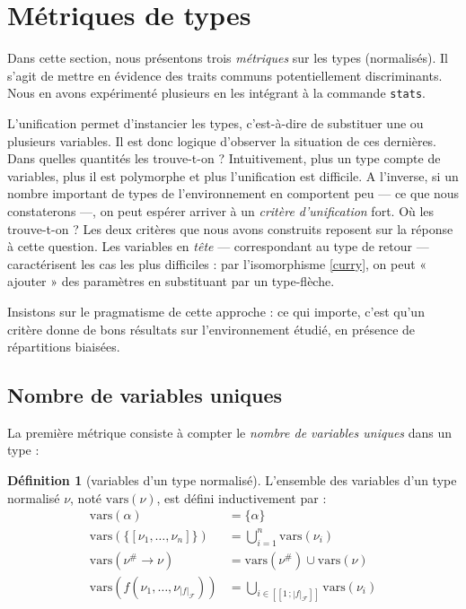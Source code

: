 \documentclass[a4paper]{report}
\theoremstyle{definition}
\newtheorem{definition}[theoreme]{Définition}
\newcommand{\interval}[2]{[\![#1\,;#2]\!]}
\newcommand{\mset}[1]{\{\![#1]\!\}}
\newcommand{\F}{\mathscr{F}}
\begin{document}

\section{Métriques de types}

Dans cette section, nous présentons trois \emph{métriques} sur les types (normalisés). Il s'agit de mettre en évidence des traits communs potentiellement discriminants. Nous en avons expérimenté plusieurs en les intégrant à la commande \texttt{stats}.

L'unification permet d'instancier les types, c'est-à-dire de substituer une ou plusieurs variables. Il est donc logique d'observer la situation de ces dernières. Dans quelles quantités les trouve-t-on ? Intuitivement, plus un type compte de variables, plus il est polymorphe et plus l'unification est difficile. A l'inverse, si un nombre important de types de l'environnement en comportent peu — ce que nous constaterons —, on peut espérer arriver à un \emph{critère d'unification} fort. Où les trouve-t-on ? Les deux critères que nous avons construits reposent sur la réponse à cette question. Les variables en \emph{tête} — correspondant au type de retour — caractérisent les cas les plus difficiles : par l'isomorphisme \eqref{curry}, on peut « ajouter » des paramètres en substituant par un type-flèche.

Insistons sur le pragmatisme de cette approche : ce qui importe, c'est qu'un critère donne de bons résultats sur l'environnement étudié, en présence de répartitions biaisées.


\subsection{Nombre de variables uniques}

La première métrique consiste à compter le \emph{nombre de variables uniques} dans un type :

\begin{definition}[variables d'un type normalisé]
  L'ensemble des variables d'un type normalisé $\nu$, noté $\mathrm{vars} (\nu)$, est défini inductivement par :
  \begin{align*}
      \mathrm{vars} (\alpha) &=
      \{ \alpha \}
    \\
      \mathrm{vars} (\mset{\nu_1, \dots, \nu_n}) &=
      \bigcup _{i=1}^n \mathrm{vars} (\nu_i)
    \\
      \mathrm{vars} (\nu^\# \rightarrow \nu) &=
      \mathrm{vars} (\nu^\#) \cup \mathrm{vars} (\nu)
    \\
      \mathrm{vars} (f (\nu_1, \dots, \nu_{|f|_\F})) &=
      \bigcup_{i \in \interval 1 {|f|_\F}} \mathrm{vars} (\nu_i)
  \end{align*}
\end{definition}
\end{document}
